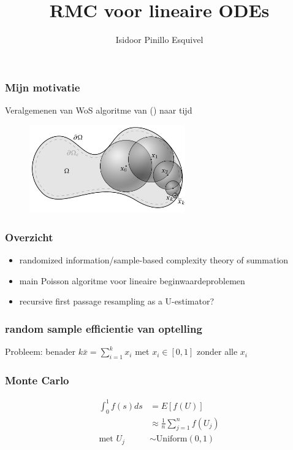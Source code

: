 \documentclass[18pt,aspectratio=149]{beamer}
\title{RMC voor lineaire ODEs}
\author{Isidoor Pinillo Esquivel }
\date{}
\begin{document}
\begin{frame}
    \titlepage
\end{frame}
\begin{frame}
    \frametitle{Mijn motivatie}
    Veralgemenen van WoS algoritme van (\cite{sawhney_grid-free_2022})
    naar tijd
    \vspace{-0.25cm}
    \begin{figure}[h!]
        \centering
        \includegraphics[width=0.6\textwidth]{imgs/Walk_on_Spheres_illustration.jpg}
        \label{fig:Walk_on_Spheres_illustration.jpg}
    \end{figure}
\end{frame}

\begin{frame}
    \frametitle{Overzicht}
    \begin{itemize}
        \item randomized information/sample-based complexity theory of summation
        \item main Poisson algoritme voor lineaire beginwaardeproblemen
        \item recursive first passage resampling as a U-estimator?
    \end{itemize}
\end{frame}


\begin{frame}
    \frametitle{random sample efficientie van optelling}
    Probleem: benader $k\bar{x} = \sum_{i=1}^{k} x_{i}$ met $x_{i}\in [0,1]$ zonder alle $x_{i}$
\end{frame}

\begin{frame}
    \frametitle{Monte Carlo}
    \vspace{-1cm}
    \begin{align}
        \int_{0}^{1} f(s) ds & = E[f(U)]                                   \\
                             & \approx \frac{1}{n} \sum_{j=1}^{n} f(U_{j}) \\
        \text{met } U_{j}    & \sim \text{Uniform}(0,1)
    \end{align}
\end{frame}
\end{document}
